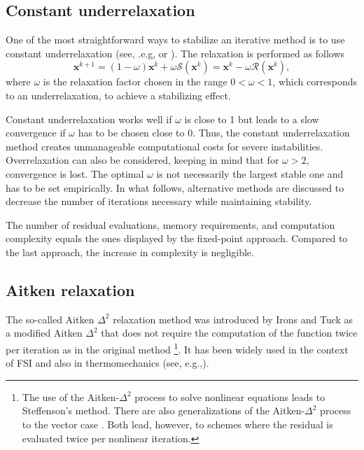           \subsection{Constant underrelaxation} \label{sec:underrelaxation}

          One of the most straightforward ways to stabilize an iterative method is to use constant underrelaxation (see, .e.g, \cite{erbts_accelerated_2012} or \cite{gatzhammer_efficient_2014}).
          The relaxation is performed as follows
          \begin{equation} \label{eq:constant_relaxation}
            \mathbf{x}^{k+1}=(1-\omega) \mathbf{x}^{k}+\omega\bm{\mathcal{S}}(\mathbf{x}^k)=\mathbf{x}^{k} -\omega \bm{\mathcal{R}}(\mathbf{x}^k),
          \end{equation}
          where \(\omega\) is the relaxation factor chosen in the range \(0<\omega<1\), which corresponds to an underrelaxation, to achieve a stabilizing effect.

          Constant underrelaxation works well if \(\omega\) is close to 1 but leads to a slow convergence if \(\omega\) has to be chosen close to 0.
          Thus, the constant underrelaxation method creates unmanageable computational costs for severe instabilities.
          Overrelaxation can also be considered, keeping in mind that for \(\omega > 2\), convergence is lost.
          The optimal \(\omega\) is not necessarily the largest stable one \citep{gatzhammer_efficient_2014} and has to be set empirically.
          In what follows, alternative methods are discussed to decrease the number of iterations necessary while maintaining stability.

          The number of residual evaluations, memory requirements, and computation complexity equals the ones displayed by the fixed-point approach.
          Compared to the last approach, the increase in complexity is negligible.

          \subsection{Aitken relaxation} \label{sec:aitken_relaxation}


          The so-called Aitken \(\Delta^2\) relaxation method was introduced by Irons and Tuck \citep{irons_version_1969} as a modified Aitken \(\Delta^2\) that does not require the computation of the function twice per iteration as in the original method \footnote{The use of the Aitken-\(\Delta^2\) process to solve nonlinear equations leads to Steffenson's method. There are also generalizations of the Aitken-\(\Delta^2\) process to the vector case \citep{sidi_vector_2017}. Both lead, however, to schemes where the residual is evaluated twice per nonlinear iteration.}.
          It has been widely used in the context of FSI \citep{irons_version_1969, kuttler_fixed-point_2008, joosten_analysis_2009, kuttler_vector_2009} and also in thermomechanics (see, e.g.,\cite{erbts_accelerated_2012, danowski_computational_2014, erbts_partitioned_2015, wendt_partitioned_2015}).

